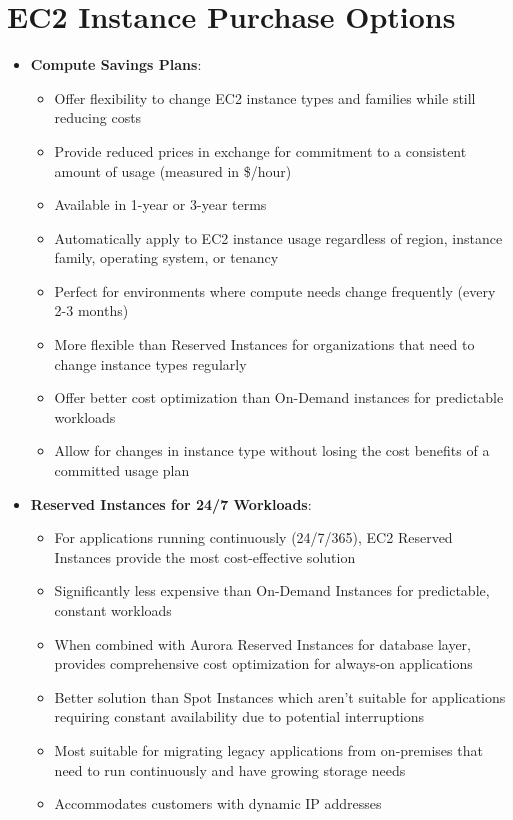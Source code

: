 \documentclass[11pt,a4paper]{report}
\begin{document}
\section{EC2 Instance Purchase Options}

\begin{itemize}
  \item \textbf{Compute Savings Plans}:
\begin{itemize}
  \item Offer flexibility to change EC2 instance types and families while still reducing costs
  \item Provide reduced prices in exchange for commitment to a consistent amount of usage (measured in \$/hour)
  \item Available in 1-year or 3-year terms
  \item Automatically apply to EC2 instance usage regardless of region, instance family, operating system, or tenancy
  \item Perfect for environments where compute needs change frequently (every 2-3 months)
  \item More flexible than Reserved Instances for organizations that need to change instance types regularly
  \item Offer better cost optimization than On-Demand instances for predictable workloads
  \item Allow for changes in instance type without losing the cost benefits of a committed usage plan
\end{itemize}
  \item \textbf{Reserved Instances for 24/7 Workloads}:
\begin{itemize}
  \item For applications running continuously (24/7/365), EC2 Reserved Instances provide the most cost-effective solution
  \item Significantly less expensive than On-Demand Instances for predictable, constant workloads
  \item When combined with Aurora Reserved Instances for database layer, provides comprehensive cost optimization for always-on applications
  \item Better solution than Spot Instances which aren't suitable for applications requiring constant availability due to potential interruptions
  \item Most suitable for migrating legacy applications from on-premises that need to run continuously and have growing storage needs
  \item Accommodates customers with dynamic IP addresses

\end{itemize}
\end{itemize}
\end{document}
